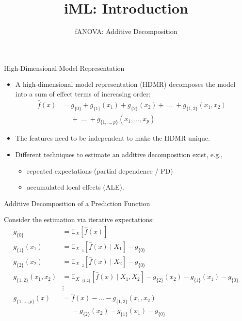 \documentclass[aspectratio=169]{../latex_main/tntbeamer}  %
\title[Introduction]{iML: Introduction}
\subtitle{fANOVA: Additive Decomposition}
\begin{document}
	
	\maketitle

\begin{frame}[c]{High-Dimensional Model Representation}
	
	\begin{itemize}
		\item
		A high-dimensional model representation (HDMR) decomposes the model into a sum of effect terms of increasing order:
		\begin{align*}
		\hat{f}(x) &= g_{\{0\}} + g_{\{1\}}(x_1) + g_{\{2\}}(x_2) + \;\dots\; + g_{\{1, 2\}}(x_1, x_2) \\
		&\phantom{{}={}} + \;\dots\; + g_{\{1,\ldots,p\}}(x_1, \ldots,x_p)
		\end{align*}
		\pause
		\item The features need to be independent to make the HDMR unique.
		\pause
		\item Different techniques to estimate an additive decomposition exist, e.g., 
		\begin{itemize}
			\item repeated expectations (partial dependence / PD) 
			\item  accumulated local effects (ALE).
		\end{itemize}
		
	\end{itemize}
\end{frame}

\begin{frame}[c]{Additive Decomposition of a Prediction Function}
	
	Consider the estimation via iterative expectations:
	\begin{align*}
	g_{\{0\}} &= \mathbb{E}_X\left[\widehat{f}(x)\right] \\
	g_{\{1\}}(x_1) &= \mathbb{E}_{X_{-1}}\left[\widehat{f}(x) \; \vert  \; X_1 \right] - g_{\{0\}} \\
	g_{\{2\}}(x_2) &= \mathbb{E}_{X_{-2}}\left[\widehat{f}(x) \; \vert  \; X_2 \right] - g_{\{0\}} \\
	g_{\{1, 2\}}(x_1, x_2) &= \mathbb{E}_{X_{-\{1,2\}}}\left[\widehat{f}(x) \; \vert \; X_1, X_2 \right] - g_{\{2\}}(x_2) - g_{\{1\}}(x_1) - g_{\{0\}}\\
	&\vdots \\
	g_{\{1, \dots, p\}}(x) &= \widehat{f}(x) - \ldots - g_{\{1, 2\}}(x_1, x_2) \\
	&\phantom{{}={}} - g_{\{2\}}(x_2) - g_{\{1\}}(x_1) - g_{\{0\}}\\
	\end{align*}
	
\end{frame}
\end{document}
